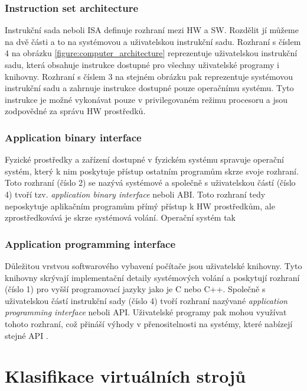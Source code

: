     \subsubsection*{Instruction set architecture}
    \label{subsubsection:isa}
    
    Instrukční sada neboli ISA definuje rozhraní mezi HW a SW. Rozdělit jí můžeme na dvě části a to na systémovou a uživatelskou instrukční sadu. Rozhraní s číslem 4 na obrázku \ref{figure:computer_architecture}
    reprezentuje uživatelskou instrukční sadu, která obsahuje instrukce dostupné pro všechny uživatelské programy i knihovny. Rozhraní s číslem 3 na stejném obrázku pak reprezentuje systémovou instrukční sadu a zahrnuje
    instrukce dostupné pouze operačnímu systému. Tyto instrukce je možné vykonávat pouze v privilegovaném režimu procesoru a jsou zodpovědné za správu HW prostředků.

    \subsubsection*{Application binary interface}
    \label{subsubsection:abi}
    
    Fyzické prostředky a zařízení dostupné v fyzickém systému spravuje operační systém, který k nim poskytuje přístup ostatním programům skrze svoje rozhraní. Toto rozhraní (číslo 2) se nazývá systémové a společně s uživatelskou
    částí (číslo 4) tvoří tzv. \textit{application binary interface} neboli ABI. Toto rozhraní tedy neposkytuje aplikačním programům přímý přístup k HW prostředkům, ale zprostředkovává je skrze systémová volání.
    Operační systém tak 

    \subsubsection*{Application programming interface}
    \label{subsubsection:api}
    
    Důležitou vrstvou softwarového vybavení počítače jsou uživatelské knihovny. Tyto knihovny skrývají implementační detaily systémových volání a poskytují rozhraní (číslo 1) pro vyšší programovací jazyky
    jako je C nebo C++. Společně s uživatelskou částí instrukční sady (číslo 4) tvoří rozhraní nazývané \textit{application programming interface} neboli API. Uživatelské programy pak mohou využívat tohoto rozhraní,
    což přináší výhody v přenositelnosti na systémy, které nabízejí stejné API .

\section{Klasifikace virtuálních strojů}
\label{subsection:clasification}

